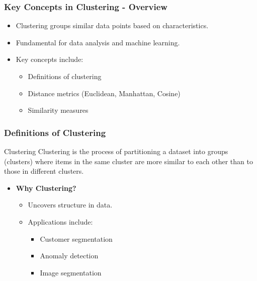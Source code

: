 \documentclass[aspectratio=169]{beamer}
\begin{document}
\begin{frame}[fragile]
    \frametitle{Key Concepts in Clustering - Overview}
    \begin{itemize}
        \item Clustering groups similar data points based on characteristics.
        \item Fundamental for data analysis and machine learning.
        \item Key concepts include:
        \begin{itemize}
            \item Definitions of clustering
            \item Distance metrics (Euclidean, Manhattan, Cosine)
            \item Similarity measures
        \end{itemize}
    \end{itemize}
\end{frame}

\begin{frame}[fragile]
    \frametitle{Definitions of Clustering}
    \begin{block}{Clustering}
        Clustering is the process of partitioning a dataset into groups (clusters)
        where items in the same cluster are more similar to each other than to those in different clusters.
    \end{block}
    
    \begin{itemize}
        \item \textbf{Why Clustering?}
        \begin{itemize}
            \item Uncovers structure in data.
            \item Applications include:
            \begin{itemize}
                \item Customer segmentation
                \item Anomaly detection
                \item Image segmentation
            \end{itemize}
        \end{itemize}
    \end{itemize}
\end{frame}
\end{document}
